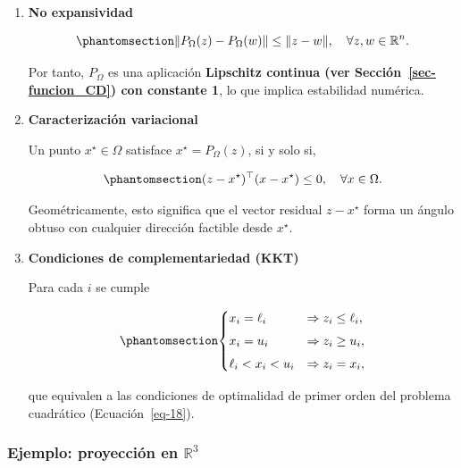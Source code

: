 \documentclass[
  spanish,
  us-letterpaper,
]{scrreprt}
\numberwithin{equation}{section}
\begin{document}
\begin{enumerate}
\def\labelenumi{\arabic{enumi}.}
\item
  \textbf{No expansividad}

  \begin{equation}\phantomsection\label{eq-20}{
  \|P_\Omega(z) - P_\Omega(w)\| \le \|z - w\|, \quad \forall z,w \in \mathbb{R}^n.
  }\end{equation}

  Por tanto, \(P_\Omega\) es una aplicación \textbf{Lipschitz continua
  (ver Sección~\ref{sec-funcion_CD}) con constante 1}, lo que implica
  estabilidad numérica.
\item
  \textbf{Caracterización variacional}

  Un punto \(x^\star \in \Omega\) satisface \(x^\star = P_\Omega(z)\),
  si y solo si,

  \begin{equation}\phantomsection\label{eq-21}{
  (z - x^\star)^\top (x - x^\star) \le 0, \quad \forall x \in \Omega.
  }\end{equation}

  Geométricamente, esto significa que el vector residual \(z - x^\star\)
  forma un ángulo obtuso con cualquier dirección factible desde
  \(x^\star\).
\item
  \textbf{Condiciones de complementariedad (KKT)}

  Para cada \(i\) se cumple

  \begin{equation}\phantomsection\label{eq-22}{
  \begin{cases}
  x_i = \ell_i &\Rightarrow z_i \le \ell_i,\\[4pt]
  x_i = u_i &\Rightarrow z_i \ge u_i,\\[4pt]
  \ell_i < x_i < u_i &\Rightarrow z_i = x_i,
  \end{cases}
  }\end{equation}

  que equivalen a las condiciones de optimalidad de primer orden del
  problema cuadrático (Ecuación~\ref{eq-18}).
\end{enumerate}

\subsubsection{\texorpdfstring{Ejemplo: proyección en
\(\mathbb{R}^3\)}{Ejemplo: proyección en \textbackslash mathbb\{R\}\^{}3}}\label{ejemplo-proyecciuxf3n-en-mathbbr3}
\end{document}
